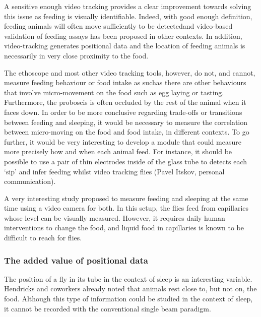 A sensitive enough video tracking provides a clear improvement towards solving this issue as feeding is visually identifiable.
Indeed, with good enough definition, feeding animals will often move sufficiently to be detected\emd{}and video-based validation of feeding assays has been proposed in other contexts\cite{mair_calories_2005,wong_quantification_2009,itskov_automated_2014}. 
In addition, video-tracking generates positional data and the location of feeding animals is necessarily in very close proximity to the food.

The ethoscope and most other video tracking tools, however, do not, and cannot, measure feeding behaviour or food intake as such\emd{}as there are other behaviours that involve micro-movement on the food such as egg laying or tasting.
Furthermore, the proboscis is often occluded by the rest of the animal when it faces down.
In order to be more conclusive regarding trade-offs or transitions between feeding and sleeping, it would be necessary to measure the correlation between micro-moving on the food and food intake, in different contexts.
To go further, it would be very interesting to develop a module that could measure more precisely 
how and when each animal feed.
For instance, it should be possible to use a pair of thin electrodes inside of the glass tube to detects each `sip' and infer feeding whilst video tracking flies \cite{itskov_automated_2014} (Pavel Itskov, personal communication).

A very interesting study proposed to measure feeding and sleeping at the same time using a video camera for both\cite{murphy_postprandial_2016,murphy_simultaneous_2017}. 
In this setup, the flies feed from capillaries whose level can be visually measured.
However, it requires daily human interventions to change the food,
and liquid food in capillaries is known to be difficult to reach for flies\cite{ro_flic_2014}.


\subsubsection{The added value of positional data}
The position of a fly in its tube in the context of sleep is an interesting variable\cite{hendricks_rest_2000,dilley_behavioral_2018,donelson_high-resolution_2012,garbe_context-specific_2015}. 
Hendricks and coworkers already noted that animals rest close to, but not on, the food\cite{hendricks_rest_2000}.
Although this type of information could be studied in the context of sleep, it cannot be recorded with the conventional single beam paradigm.

